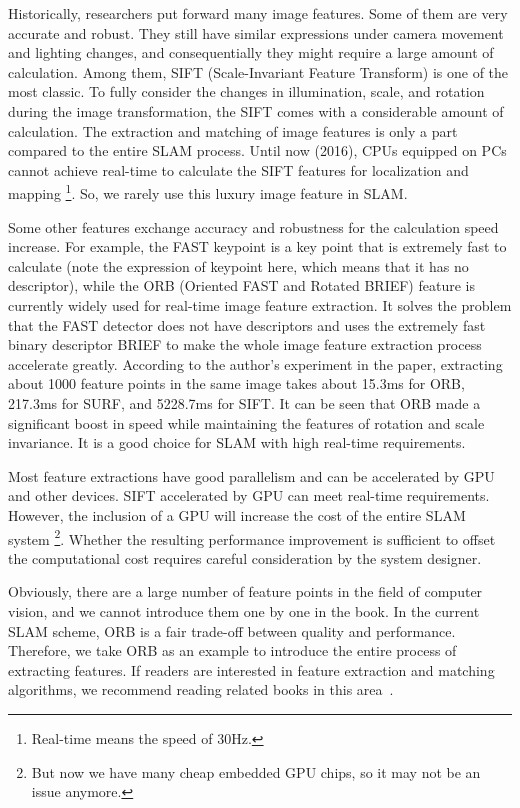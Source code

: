 Historically, researchers put forward many image features. Some of them are very accurate and robust. They still have similar expressions under camera movement and lighting changes, and consequentially they might require a large amount of calculation. Among them, SIFT (Scale-Invariant Feature Transform) is one of the most classic. To fully consider the changes in illumination, scale, and rotation during the image transformation, the SIFT comes with a considerable amount of calculation. The extraction and matching of image features is only a part compared to the entire SLAM process. Until now (2016), CPUs equipped on PCs cannot achieve real-time to calculate the SIFT features for localization and mapping \footnote{Real-time means the speed of 30Hz. }. So, we rarely use this luxury image feature in SLAM.

Some other features exchange accuracy and robustness for the calculation speed increase. For example, the FAST keypoint is a key point that is extremely fast to calculate (note the expression of keypoint here, which means that it has no descriptor), while the ORB (Oriented FAST and Rotated BRIEF) feature is currently widely used for real-time image feature extraction. It solves the problem that the FAST detector  {\cite{Rosten2006}} does not have descriptors and uses the extremely fast binary descriptor BRIEF {\cite{calonder2010brief}} to make the whole image feature extraction process accelerate greatly. According to the author's experiment in the paper, extracting about 1000 feature points in the same image takes about 15.3ms for ORB, 217.3ms for SURF, and 5228.7ms for SIFT. It can be seen that ORB made a significant boost in speed while maintaining the features of rotation and scale invariance. It is a good choice for SLAM with high real-time requirements.

Most feature extractions have good parallelism and can be accelerated by GPU and other devices. SIFT accelerated by GPU can meet real-time requirements. However, the inclusion of a GPU will increase the cost of the entire SLAM system \footnote{But now we have many cheap embedded GPU chips, so it may not be an issue anymore.}. Whether the resulting performance improvement is sufficient to offset the computational cost requires careful consideration by the system designer.

Obviously, there are a large number of feature points in the field of computer vision, and we cannot introduce them one by one in the book. In the current SLAM scheme, ORB is a fair trade-off between quality and performance. Therefore, we take ORB as an example to introduce the entire process of extracting features. If readers are interested in feature extraction and matching algorithms, we recommend reading related books in this area~\cite{Nixon2012}.

